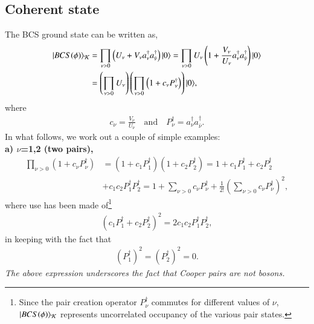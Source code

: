 

\begin{subappendices} 
\section[Coherent state]{Coherent state}\label{App3E}
The BCS ground state can be written as,
\begin{align}\label{eq1App3Ex} 
\nonumber |{BCS(\phi)} \rangle_{\mathcal K}&=\prod_{\nu>0}\left(U_\nu+V_\nu a_\nu^\dagger a_{\bar{\nu}}^\dagger\right)|{0} \rangle=\prod_{\nu>0}U_\nu\left(1+\frac{V_\nu}{U_\nu} a_\nu^\dagger a_{\bar{\nu}}^\dagger\right)|{0} \rangle\\
&=\left(\prod_{\nu>0}U_\nu\right)\left(\prod_{\nu>0}\left(1+c_\nu P_\nu^\dagger\right)\right)|{0} \rangle,
\end{align}
where
\begin{align}\label{eq2App3Ex} 
 c_\nu=\frac{V_\nu}{U_\nu}\quad\text{and}\quad P_\nu^\dagger=a_\nu^\dagger a_{\bar{\nu}}^\dagger.
\end{align}
In what follows, we work out a couple of simple examples:\\
\textbf{a) $\nu$=1,2 (two pairs),}
\begin{align}\label{eq2App4Ex} 
 \nonumber \prod_{\nu>0}\left(1+c_\nu P_\nu^\dagger\right)&=\left(1+c_1P_1^\dagger\right)\left(1+c_2P_2^\dagger\right)=1+c_1P_1^\dagger+c_2P_2^\dagger\\
 &+c_1c_2P_1^\dagger P_2^\dagger=1+\sum_{\nu>0}c_\nu P_\nu^\dagger + \frac{1}{2!}\left(\sum_{\nu>0}c_\nu P^\dagger_\nu\right)^2,
\end{align}
where use has been made of\footnote{Since the pair creation operator $P_\nu^\dagger$ commutes for different values of $\nu$, $|{BCS(\phi)} \rangle_{\mathcal K}$ represents uncorrelated occupancy of the various pair states.}
\begin{align}\label{eq2App5Ex} 
\left(c_1P_1^\dagger+ c_2P_2^\dagger\right)^2=2c_1c_2P_1^\dagger P_2^\dagger,
\end{align}
in keeping with  the fact that
\begin{align}\label{eq2App6Ex}
\left(P_1^\dagger\right)^2=\left(P_2^\dagger\right)^2=0.
\end{align}
\textit{The above expression underscores the fact that Cooper pairs are not bosons.}\\

\end{subappendices}

